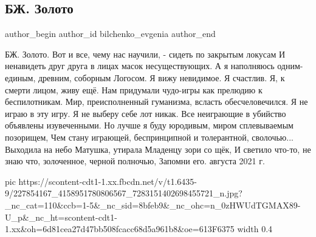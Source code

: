  
 
 
 
 
 
\subsection{БЖ. Золото}
\label{sec:16_08_2021.fb.bilchenko_evgenia.1.zoloto}
 
\ifcmt
 author_begin
   author_id bilchenko_evgenia
 author_end
\fi

\obeycr
БЖ. Золото.
\smallskip
Вот и все, чему нас научили, - сидеть по закрытым локусам
И ненавидеть друг друга в лицах масок несуществующих.
А я наполняюсь одним-единым, древним, соборным Логосом.
Я вижу невидимое. Я счастлив. Я, к смерти лицом, живу ещё.
\smallskip
Нам придумали чудо-игры как прелюдию к беспилотникам.
Мир, преисполненный гуманизма, всласть обесчеловечился.
Я не играю в эту игру. Я не выберу себе лот никак.
Все неиграющие в убийство объявлены изувеченными.
\smallskip
Но лучше я буду юродивым, миром сплевываемым позорищем,
Чем стану играющей, беспринципной и толерантной, сволочью...
Выходила на небо Матушка, утирала Младенцу зори со щёк,
И светило что-то, не знаю что, золоченное, черной полночью,
\smallskip
Запомни его.
 августа 2021 г.
\restorecr

\ifcmt
  pic https://scontent-cdt1-1.xx.fbcdn.net/v/t1.6435-9/227854167_4158951780806567_7283151402698455721_n.jpg?_nc_cat=110&ccb=1-5&_nc_sid=8bfeb9&_nc_ohc=n_0zHWUdTGMAX89-U_p&_nc_ht=scontent-cdt1-1.xx&oh=6d81cea27d47bb508fcacc68d5a961b8&oe=613F6375
  width 0.4
\fi

